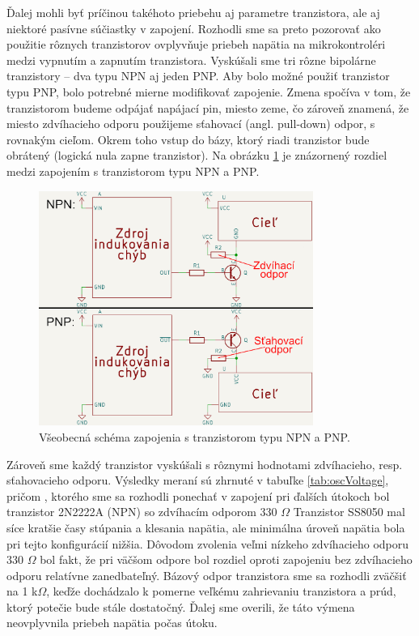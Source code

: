 Ďalej mohli byť príčinou takéhoto priebehu aj parametre tranzistora, ale aj niektoré pasívne súčiastky v zapojení. Rozhodli sme sa preto pozorovať ako použitie rôznych tranzistorov ovplyvňuje priebeh napätia na mikrokontroléri medzi vypnutím a zapnutím tranzistora. Vyskúšali sme tri rôzne bipolárne tranzistory -- dva typu NPN aj jeden PNP. Aby bolo možné použiť tranzistor typu PNP, bolo potrebné mierne modifikovať zapojenie. Zmena spočíva v tom, že tranzistorom budeme odpájať napájací pin, miesto zeme, čo zároveň znamená, že miesto zdvíhacieho odporu použijeme sťahovací (angl. pull-down) odpor, s rovnakým cieľom. Okrem toho vstup do bázy, ktorý riadi tranzistor bude obrátený (logická nula zapne tranzistor). Na obrázku \ref{obr:npnVpnp} je znázornený rozdiel medzi zapojením s tranzistorom typu NPN a PNP.

\begin{figure}
    \centerline{\includegraphics[width=0.8\textwidth]{images/npnVpnp.png}}
    \caption[Všeobecná schéma zapojenia s tranzistorom typu NPN a PNP]{Všeobecná schéma zapojenia s tranzistorom typu NPN a PNP.}
    \label{obr:npnVpnp}
\end{figure}

Zároveň sme každý tranzistor vyskúšali s rôznymi hodnotami zdvíhacieho, resp. sťahovacieho odporu. Výsledky meraní sú zhrnuté v tabuľke \ref{tab:oscVoltage}, pričom , ktorého sme sa rozhodli ponechať v zapojení pri ďalších útokoch bol tranzistor 2N2222A (NPN) so zdvíhacím odporom 330 $\Omega$ Tranzistor SS8050 mal síce kratšie časy stúpania a klesania napätia, ale minimálna úroveň napätia bola pri tejto konfigurácií nižšia. Dôvodom zvolenia veľmi nízkeho zdvíhacieho odporu 330 $\Omega$ bol fakt, že pri väčšom odpore bol rozdiel oproti zapojeniu bez zdvíhacieho odporu relatívne zanedbateľný. Bázový odpor tranzistora sme sa rozhodli zväčšiť na 1 k$\Omega$, keďže dochádzalo k pomerne veľkému zahrievaniu tranzistora a prúd, ktorý potečie bude stále dostatočný. Ďalej sme overili, že táto výmena neovplyvnila priebeh napätia počas útoku.


